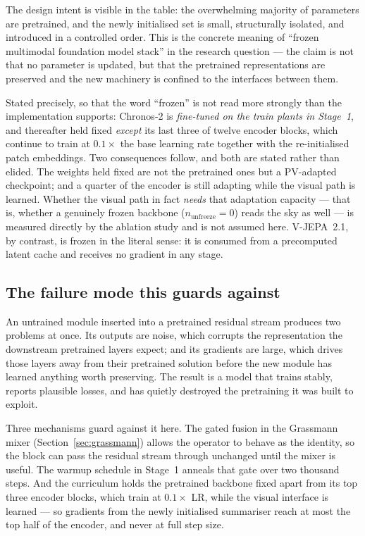 The design intent is visible in the table: the overwhelming majority of parameters are
pretrained, and the newly initialised set is small, structurally isolated, and introduced in
a controlled order. This is the concrete meaning of ``frozen multimodal foundation model
stack'' in the research question --- the claim is not that no parameter is updated, but that
the pretrained representations are preserved and the new machinery is confined to the
interfaces between them.

Stated precisely, so that the word ``frozen'' is not read more strongly than the
implementation supports: Chronos-2 is \emph{fine-tuned on the train plants in Stage~1}, and
thereafter held fixed \emph{except} its last three of twelve encoder blocks, which continue to
train at $0.1\times$ the base learning rate together with the re-initialised patch
embeddings. Two consequences follow, and both are stated rather than elided. The weights
held fixed are not the pretrained ones but a PV-adapted checkpoint; and a quarter of the
encoder is still adapting while the visual path is learned. Whether the visual path in fact
\emph{needs} that adaptation capacity --- that is, whether a genuinely frozen backbone
($n_{\text{unfreeze}} = 0$) reads the sky as well --- is measured directly by the ablation
study and is not assumed here. V-JEPA~2.1, by contrast, is frozen in
the literal sense: it is consumed from a precomputed latent cache and receives no gradient
in any stage.

\subsection{The failure mode this guards against}

An untrained module inserted into a pretrained residual stream produces two problems at once.
Its outputs are noise, which corrupts the representation the downstream pretrained layers
expect; and its gradients are large, which drives those layers away from their pretrained
solution before the new module has learned anything worth preserving. The result is a model
that trains stably, reports plausible losses, and has quietly destroyed the pretraining it was
built to exploit.

Three mechanisms guard against it here. The gated fusion in the Grassmann mixer
(Section~\ref{sec:grassmann}) allows the operator to behave as the identity, so the block can
pass the residual stream through unchanged until the mixer is useful. The warmup schedule in
Stage~1 anneals that gate over two thousand steps. And the curriculum holds the pretrained
backbone fixed apart from its top three encoder blocks, which train at $0.1\times$ LR, while
the visual interface is learned --- so gradients from the newly initialised summariser reach
at most the top half of the encoder, and never at full step size.

